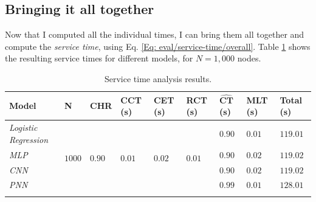 			\subsection{Bringing it all together} \label{Section: eval/service-time/together}
			Now that I computed all the individual times, I can bring them all together and compute the \textit{service time}, using Eq. \ref{Eq: eval/service-time/overall}. Table \ref{Table: eval/service-time/together/overall} shows the resulting service times for different models, for $N=1,000$ nodes.
			\begin{longtable}{|p{}||p{.08\textwidth}|p{}|p{}|p{}|p{}|p{}|p{}||p{}|}
				\textbf{Model} & \textbf{N} & \textbf{CHR}  &\textbf{CCT} (s) & \textbf{CET} (s) & \textbf{RCT} (s)& $\mathbf{\hat{CT}}$ (s)& \textbf{MLT} (s) & \textbf{Total} (s)\\
				\hline
				\textit{Logistic Regression} & \multirow{5}{*}{$1000$} & \multirow{5}{*}{$0.90$} & \multirow{5}{*}{$0.01$} & \multirow{5}{*}{$0.02$} & \multirow{5}{*}{$0.01$} & $0.90$ & $0.01$ & \cellcolor{green!20} $\mathbf{119.01}$ \\
				\hhline{-~~~~---}
				\textit{MLP} &  &  &   & &  & $0.90$ & $0.02$ &\cellcolor{green!20} $\mathbf{119.02}$  \\
				\hhline{-~~~~---}
				\textit{CNN} &  &  &  & &  & $0.90$ & $0.02$ & \cellcolor{green!20} $\mathbf{119.02}$ \\
				\hhline{-~~~~---}
				\hhline{-~~~~---}
				\textit{PNN} &  &  &  & &  & $0.99$ & $0.01$ & \cellcolor{green!20} $\mathbf{128.01}$ \\
				\hline
				\caption{Service time analysis results.}
				\label{Table: eval/service-time/together/overall}
			\end{longtable}
			
